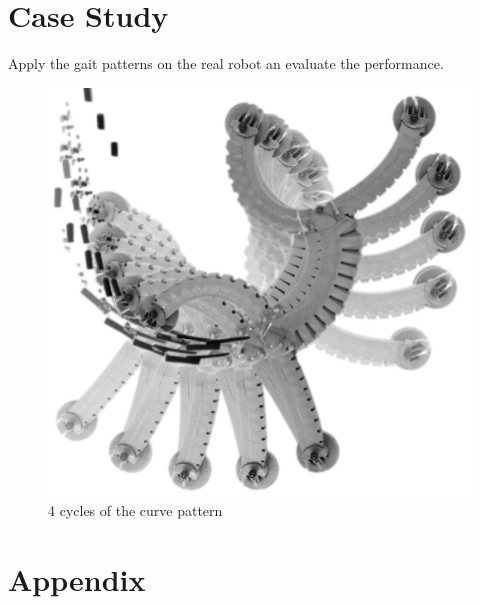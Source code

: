 \documentclass[10pt,a4paper]{article}
\begin{document}
\section{Case Study}

Apply the gait patterns on the real robot an evaluate the performance.

\begin{figure}[h]
\begin{center}
\includegraphics[width=.4\textwidth, angle=90]{../Pics/experiment/curve.png}
\caption{4 cycles of the curve pattern}
\end{center}
\end{figure}


\clearpage
\appendix
\section{Appendix}
\end{document}
